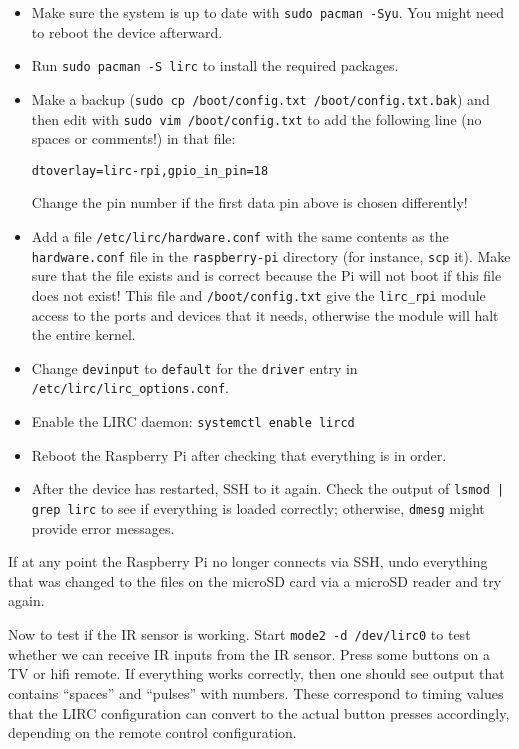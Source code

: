 \documentclass{article}
\begin{document}
\begin{itemize}
    \item Make sure the system is up to date with {\tt sudo pacman -Syu}. You
          might need to reboot the device afterward.
    \item Run {\tt sudo pacman -S lirc} to install the required packages.
    \item Make a backup ({\tt sudo cp /boot/config.txt /boot/config.txt.bak}) 
          and then edit with {\tt sudo vim /boot/config.txt} to add the 
          following line (no spaces or comments!) in that file:

          {\tt dtoverlay=lirc-rpi,gpio\_in\_pin=18}

          Change the pin number if the first data pin above is chosen 
          differently!
    \item Add a file {\tt /etc/lirc/hardware.conf} with the same contents as 
          the {\tt hardware.conf} file in the {\tt raspberry-pi} directory (for 
          instance, {\tt scp} it).  Make sure that the file exists and is 
          correct because the Pi will not boot if this file does not exist!  
          This file and {\tt /boot/config.txt} give the {\tt lirc\_rpi} module 
          access to the ports and devices that it needs, otherwise the module 
          will halt the entire kernel.
    \item Change {\tt devinput} to {\tt default} for the {\tt driver} entry in 
          {\tt /etc/lirc/lirc\_options.conf}.
    \item Enable the LIRC daemon: {\tt systemctl enable lircd}
    \item Reboot the Raspberry Pi after checking that everything is in order.
    \item After the device has restarted, SSH to it again. Check the output of 
          {\tt lsmod | grep lirc} to see if everything is loaded correctly; 
          otherwise, {\tt dmesg} might provide error messages.
\end{itemize}

If at any point the Raspberry Pi no longer connects via SSH, undo everything 
that was changed to the files on the microSD card via a microSD reader and try 
again.

Now to test if the IR sensor is working. Start {\tt mode2 -d /dev/lirc0} to 
test whether we can receive IR inputs from the IR sensor. Press some buttons on 
a TV or hifi remote. If everything works correctly, then one should see output 
that contains ``spaces'' and ``pulses'' with numbers. These correspond to 
timing values that the LIRC configuration can convert to the actual button 
presses accordingly, depending on the remote control configuration.
\end{document}
